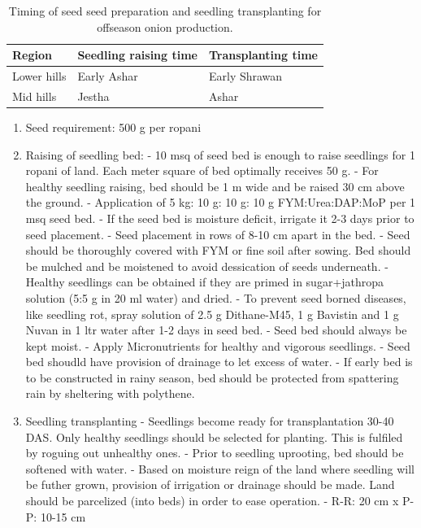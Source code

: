 \documentclass[
  openany]{book}
\providecommand{\tightlist}{%
  \setlength{\itemsep}{0pt}\setlength{\parskip}{0pt}}
\begin{document}
\begin{table}

\caption{\label{tab:offseason-onion-seed-bed}Timing of seed seed preparation and seedling transplanting for offseason onion production.}
\centering
\fontsize{10}{12}\selectfont
\begin{tabular}[t]{lll}
\toprule
Region & Seedling raising time & Transplanting time\\
\midrule
Lower hills & Early Ashar & Early Shrawan\\
Mid hills & Jestha & Ashar\\
\bottomrule
\end{tabular}
\end{table}

\begin{enumerate}
\def\labelenumi{\arabic{enumi}.}
\setcounter{enumi}{3}
\tightlist
\item
  Seed requirement: 500 g per ropani
\item
  Raising of seedling bed:
  - 10 msq of seed bed is enough to raise seedlings for 1 ropani of land. Each meter square of bed optimally receives 50 g.
  - For healthy seedling raising, bed should be 1 m wide and be raised 30 cm above the ground.
  - Application of 5 kg: 10 g: 10 g: 10 g FYM:Urea:DAP:MoP per 1 msq seed bed.
  - If the seed bed is moisture deficit, irrigate it 2-3 days prior to seed placement.
  - Seed placement in rows of 8-10 cm apart in the bed.
  - Seed should be thoroughly covered with FYM or fine soil after sowing. Bed should be mulched and be moistened to avoid dessication of seeds underneath.
  - Healthy seedlings can be obtained if they are primed in sugar+jathropa solution (5:5 g in 20 ml water) and dried.
  - To prevent seed borned diseases, like seedling rot, spray solution of 2.5 g Dithane-M45, 1 g Bavistin and 1 g Nuvan in 1 ltr water after 1-2 days in seed bed.
  - Seed bed should always be kept moist.
  - Apply Micronutrients for healthy and vigorous seedlings.
  - Seed bed shoudld have provision of drainage to let excess of water.
  - If early bed is to be constructed in rainy season, bed should be protected from spattering rain by sheltering with polythene.
\item
  Seedling transplanting
  - Seedlings become ready for transplantation 30-40 DAS. Only healthy seedlings should be selected for planting. This is fulfiled by roguing out unhealthy ones.
  - Prior to seedling uprooting, bed should be softened with water.
  - Based on moisture reign of the land where seedling will be futher grown, provision of irrigation or drainage should be made. Land should be parcelized (into beds) in order to ease operation.
  - R-R: 20 cm x P-P: 10-15 cm
\end{enumerate}
\end{document}

